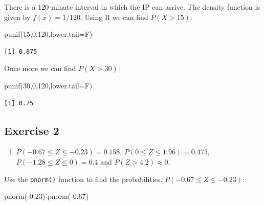 \documentclass[
  letterpaper,
  DIV=11,
  numbers=noendperiod]{scrreprt}
\newenvironment{Shaded}{\begin{snugshade}}{\end{snugshade}}
\newcommand{\AttributeTok}[1]{\textcolor[rgb]{0.40,0.45,0.13}{#1}}
\newcommand{\DecValTok}[1]{\textcolor[rgb]{0.68,0.00,0.00}{#1}}
\newcommand{\FloatTok}[1]{\textcolor[rgb]{0.68,0.00,0.00}{#1}}
\newcommand{\FunctionTok}[1]{\textcolor[rgb]{0.28,0.35,0.67}{#1}}
\newcommand{\NormalTok}[1]{\textcolor[rgb]{0.00,0.23,0.31}{#1}}
\newcommand{\SpecialCharTok}[1]{\textcolor[rgb]{0.37,0.37,0.37}{#1}}
\providecommand{\tightlist}{%
  \setlength{\itemsep}{0pt}\setlength{\parskip}{0pt}}\usepackage{longtable,booktabs,array}
\begin{document}
There is a \(120\) minute interval in which the IP can arrive. The
density function is given by \(f(x)=1/120\). Using R we can find
\(P(X>15)\):

\begin{Shaded}
\begin{Highlighting}[numbers=left,,]
\FunctionTok{punif}\NormalTok{(}\DecValTok{15}\NormalTok{,}\DecValTok{0}\NormalTok{,}\DecValTok{120}\NormalTok{,}\AttributeTok{lower.tail=}\NormalTok{F)}
\end{Highlighting}
\end{Shaded}

\begin{verbatim}
[1] 0.875
\end{verbatim}

Once more we can find \(P(X>30)\):

\begin{Shaded}
\begin{Highlighting}[numbers=left,,]
\FunctionTok{punif}\NormalTok{(}\DecValTok{30}\NormalTok{,}\DecValTok{0}\NormalTok{,}\DecValTok{120}\NormalTok{,}\AttributeTok{lower.tail=}\NormalTok{F)}
\end{Highlighting}
\end{Shaded}

\begin{verbatim}
[1] 0.75
\end{verbatim}

\hypertarget{exercise-2-19}{%
\subsection*{Exercise 2}\label{exercise-2-19}}

\begin{blackbox}

\begin{enumerate}
\def\labelenumi{\arabic{enumi}.}
\tightlist
\item
  \(P(-0.67 \leq Z \leq -0.23)=0.158\), \(P(0 \leq Z \leq 1.96)=0.475\),
  \(P(-1.28 \leq Z \leq 0)=0.4\) and \(P(Z > 4.2) \approx 0\).
\end{enumerate}

\end{blackbox}

Use the \texttt{pnorm()} function to find the probabilities.
\(P(-0.67 \leq Z \leq -0.23)\):

\begin{Shaded}
\begin{Highlighting}[numbers=left,,]
\FunctionTok{pnorm}\NormalTok{(}\SpecialCharTok{{-}}\FloatTok{0.23}\NormalTok{)}\SpecialCharTok{{-}}\FunctionTok{pnorm}\NormalTok{(}\SpecialCharTok{{-}}\FloatTok{0.67}\NormalTok{)}
\end{Highlighting}
\end{Shaded}
\end{document}
